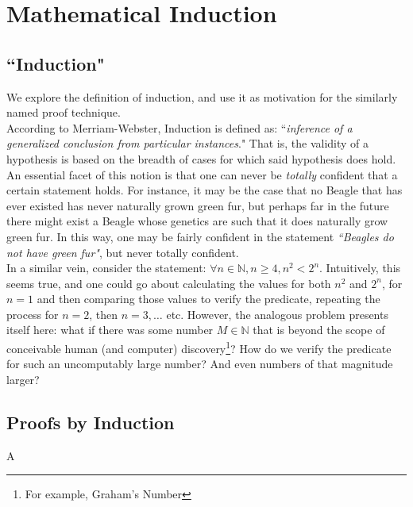 \documentclass[../proofs.tex]{subfiles}
\begin{document}
\chapter{Mathematical Induction}

\section{``Induction"}
We explore the definition of induction, and use it as motivation for the similarly named proof technique. \\

According to Merriam-Webster, Induction is defined as: ``\emph{inference of a generalized conclusion from particular instances}." That is, the validity of a hypothesis is based on the breadth of cases for which said hypothesis does hold.\\

An essential facet of this notion is that one can never be \emph{totally} confident that a certain statement holds. For instance, it may be the case that no Beagle that has ever existed has never naturally grown green fur, but perhaps far in the future there might exist a Beagle whose genetics are such that it does naturally grow green fur. In this way, one may be fairly confident in the statement \emph{``Beagles do not have green fur"}, but never totally confident. \\

 In a similar vein, consider the statement: $\forall n \in \mathbb{N}, n \geq 4, n^2 < 2^n$. Intuitively, this seems true, and one could go about calculating the values for both $n^2$ and $2^n$, for $n = 1$ and then comparing those values to verify the predicate, repeating the process for $n=2$, then $n=3, \ldots$  etc. However, the analogous problem presents itself here: what if there was some number $M \in \mathbb{N}$ that is beyond the scope of conceivable human (and computer) discovery\footnote{For example, Graham's Number}? How do we verify the predicate for such an uncomputably large number? And even numbers of that magnitude larger?

\section{Proofs by Induction}
  A
\end{document}
